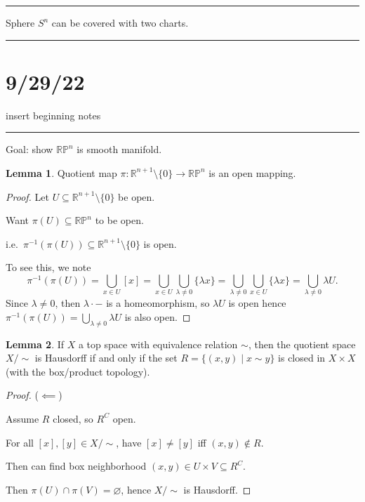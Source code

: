 \documentclass[12pt]{article}
\newcommand{\sepline}{\rule{\textwidth}{0.4pt}}
\theoremstyle{definition}
\newtheorem{lemma}{Lemma}
\newcommand{\R}{\mathbb{R}}
\renewcommand{\P}{\mathbb{P}}
\renewcommand{\emptyset}{\varnothing}
\newcommand{\<}{\left\langle}
\renewcommand{\>}{\right\rangle}
\newcommand{\seq}{\subseteq}
\begin{document}
\sepline

Sphere $S^n$ can be covered with two charts.


\sepline

\section*{9/29/22}

insert beginning notes

\sepline

Goal: show $\R\P^n$ is smooth manifold.

\begin{lemma}
    Quotient map $\pi : \R^{n+1} \setminus \{0\} \to \R\P^n$ is an open mapping.
\end{lemma}

\begin{proof}
    Let $U \seq \R^{n+1} \setminus \{0\}$ be open.

    Want $\pi(U) \seq \R\P^n$ to be open.

    i.e.\ $\pi^{-1}(\pi(U)) \seq \R^{n+1} \setminus \{0\}$ is open.

    To see this, we note
    \[
        \pi^{-1}(\pi(U))
            = \bigcup_{x \in U} [x]
            = \bigcup_{x \in U} \bigcup_{\lambda \neq 0} \{\lambda x\}
            = \bigcup_{\lambda \ne 0} \bigcup_{x \in U} \{\lambda x\}
            = \bigcup_{\lambda \ne 0} \lambda U.
    \]
    Since $\lambda \ne 0$, then $\lambda \cdot -$ is a homeomorphism, so $\lambda U$ is open hence $\pi^{-1}(\pi(U)) = \bigcup_{\lambda \ne 0} \lambda U$ is also open.
\end{proof}


\begin{lemma}
    If $X$ a top space with equivalence relation $\sim$, then the quotient space $X/{\sim}$ is Hausdorff if and only if the set $R = \{(x, y) \mid x \sim y\}$ is closed in $X \times X$ (with the box/product topology).
\end{lemma}

\begin{proof}
    ($\impliedby$)

    Assume $R$ closed, so $R^C$ open.

    For all $[x], [y] \in X/{\sim}$, have $[x] \ne [y]$ iff $(x, y) \notin R$.

    Then can find box neighborhood $(x, y) \in U \times V \seq R^C$.

    Then $\pi(U) \cap \pi(V) = \emptyset$, hence $X/{\sim}$ is Hausdorff.

\end{proof}
\end{document}
